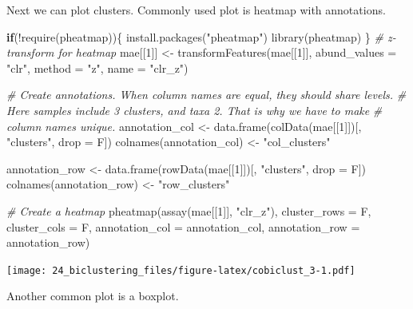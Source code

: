 \documentclass[
]{book}
\newenvironment{Shaded}{\begin{snugshade}}{\end{snugshade}}
\newcommand{\AttributeTok}[1]{\textcolor[rgb]{0.77,0.63,0.00}{#1}}
\newcommand{\CommentTok}[1]{\textcolor[rgb]{0.56,0.35,0.01}{\textit{#1}}}
\newcommand{\ControlFlowTok}[1]{\textcolor[rgb]{0.13,0.29,0.53}{\textbf{#1}}}
\newcommand{\DecValTok}[1]{\textcolor[rgb]{0.00,0.00,0.81}{#1}}
\newcommand{\FunctionTok}[1]{\textcolor[rgb]{0.00,0.00,0.00}{#1}}
\newcommand{\NormalTok}[1]{#1}
\newcommand{\OtherTok}[1]{\textcolor[rgb]{0.56,0.35,0.01}{#1}}
\newcommand{\SpecialCharTok}[1]{\textcolor[rgb]{0.00,0.00,0.00}{#1}}
\newcommand{\StringTok}[1]{\textcolor[rgb]{0.31,0.60,0.02}{#1}}
\begin{document}
Next we can plot clusters. Commonly used plot is heatmap with annotations.

\begin{Shaded}
\begin{Highlighting}[]
\ControlFlowTok{if}\NormalTok{(}\SpecialCharTok{!}\FunctionTok{require}\NormalTok{(pheatmap))\{}
    \FunctionTok{install.packages}\NormalTok{(}\StringTok{"pheatmap"}\NormalTok{)}
    \FunctionTok{library}\NormalTok{(pheatmap)}
\NormalTok{\}}
\CommentTok{\# z{-}transform for heatmap}
\NormalTok{mae[[}\DecValTok{1}\NormalTok{]] }\OtherTok{\textless{}{-}} \FunctionTok{transformFeatures}\NormalTok{(mae[[}\DecValTok{1}\NormalTok{]], }\AttributeTok{abund\_values =} \StringTok{"clr"}\NormalTok{, }\AttributeTok{method =} \StringTok{"z"}\NormalTok{, }\AttributeTok{name =} \StringTok{"clr\_z"}\NormalTok{)}

\CommentTok{\# Create annotations. When column names are equal, they should share levels. }
\CommentTok{\# Here samples include 3 clusters, and taxa 2. That is why we have to make }
\CommentTok{\# column names unique. }
\NormalTok{annotation\_col }\OtherTok{\textless{}{-}} \FunctionTok{data.frame}\NormalTok{(}\FunctionTok{colData}\NormalTok{(mae[[}\DecValTok{1}\NormalTok{]])[, }\StringTok{"clusters"}\NormalTok{, }\AttributeTok{drop =}\NormalTok{ F])}
\FunctionTok{colnames}\NormalTok{(annotation\_col) }\OtherTok{\textless{}{-}} \StringTok{"col\_clusters"}

\NormalTok{annotation\_row }\OtherTok{\textless{}{-}} \FunctionTok{data.frame}\NormalTok{(}\FunctionTok{rowData}\NormalTok{(mae[[}\DecValTok{1}\NormalTok{]])[, }\StringTok{"clusters"}\NormalTok{, }\AttributeTok{drop =}\NormalTok{ F])}
\FunctionTok{colnames}\NormalTok{(annotation\_row) }\OtherTok{\textless{}{-}} \StringTok{"row\_clusters"}

\CommentTok{\# Create a heatmap}
\FunctionTok{pheatmap}\NormalTok{(}\FunctionTok{assay}\NormalTok{(mae[[}\DecValTok{1}\NormalTok{]], }\StringTok{"clr\_z"}\NormalTok{), }\AttributeTok{cluster\_rows =}\NormalTok{ F, }\AttributeTok{cluster\_cols =}\NormalTok{ F, }
         \AttributeTok{annotation\_col =}\NormalTok{ annotation\_col,}
         \AttributeTok{annotation\_row =}\NormalTok{ annotation\_row)}
\end{Highlighting}
\end{Shaded}

\texttt{[image: 24\_biclustering\_files/figure-latex/cobiclust\_3-1.pdf]}

Another common plot is a boxplot.
\end{document}

